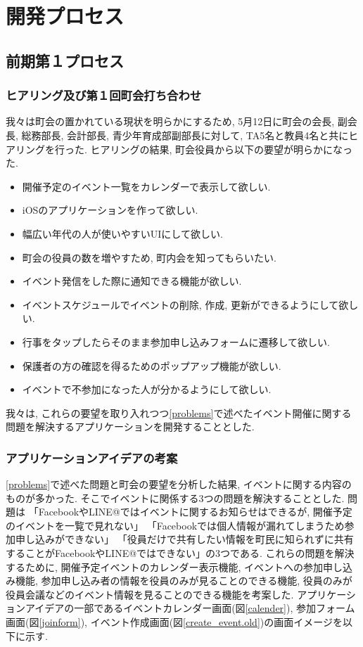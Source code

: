 \chapter{開発プロセス}

\section{前期第１プロセス}

\subsection{ヒアリング及び第１回町会打ち合わせ}
我々は町会の置かれている現状を明らかにするため,
5月12日に町会の会長, 副会長, 総務部長, 会計部長, 青少年育成部副部長に対して,
TA5名と教員4名と共にヒアリングを行った.
ヒアリングの結果, 町会役員から以下の要望が明らかになった.

\begin{itemize}
\item 開催予定のイベント一覧をカレンダーで表示して欲しい.
\item iOSのアプリケーションを作って欲しい.
\item 幅広い年代の人が使いやすいUIにして欲しい.
\item 町会の役員の数を増やすため, 町内会を知ってもらいたい.
\item イベント発信をした際に通知できる機能が欲しい.
\item イベントスケジュールでイベントの削除, 作成, 更新ができるようにして欲しい.
\item 行事をタップしたらそのまま参加申し込みフォームに遷移して欲しい.
\item 保護者の方の確認を得るためのポップアップ機能が欲しい.
\item イベントで不参加になった人が分かるようにして欲しい.
\end{itemize}

我々は, これらの要望を取り入れつつ\ref{problems}で述べたイベント開催に関する問題を解決するアプリケーションを開発することとした.


\subsection{アプリケーションアイデアの考案}
\ref{problems}で述べた問題と町会の要望を分析した結果, イベントに関する内容のものが多かった.
そこでイベントに関係する3つの問題を解決することとした. 問題は
「FacebookやLINE@ではイベントに関するお知らせはできるが, 開催予定のイベントを一覧で見れない」
「Facebookでは個人情報が漏れてしまうため参加申し込みができない」
「役員だけで共有したい情報を町民に知られずに共有することがFacebookやLINE@ではできない」の3つである.
これらの問題を解決するために, 開催予定イベントのカレンダー表示機能,
イベントへの参加申し込み機能, 参加申し込み者の情報を役員のみが見ることのできる機能,
役員のみが役員会議などのイベント情報を見ることのできる機能を考案した.
アプリケーションアイデアの一部であるイベントカレンダー画面(図\ref{calender}),
参加フォーム画面(図\ref{joinform}), イベント作成画面(図\ref{create_event.old})の画面イメージを以下に示す.


